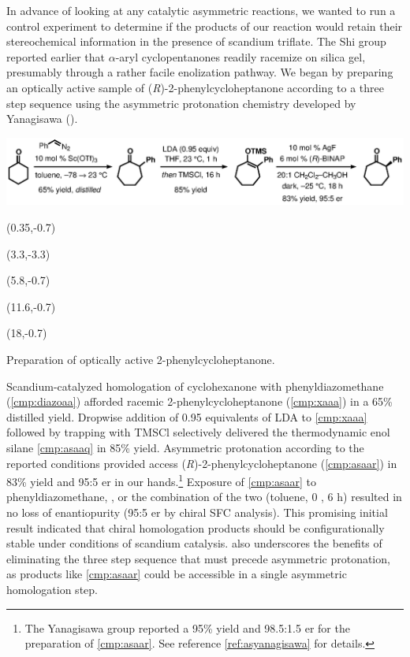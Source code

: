In advance of looking at any catalytic asymmetric reactions, we wanted to run a control experiment
to determine if the products of our reaction would retain their stereochemical information in the
presence of scandium triflate. The Shi group reported earlier that $\alpha$-aryl cyclopentanones
readily racemize on silica gel, presumably through a rather facile enolization
pathway. We began by preparing an optically active sample of
(\textit{R})-2-phenylcycloheptanone according to a three step sequence using the asymmetric
protonation chemistry developed by Yanagisawa
().
  \begin{Scheme}[h]
  \centering
  \includegraphics[scale=0.8]{chp_asymmetric/images/racemizationone}
  \begin{textblock}{1}(0.35,-0.7)  \end{textblock}
  \begin{textblock}{1}(3.3,-3.3)  \end{textblock}
  \begin{textblock}{1}(5.8,-0.7)  \end{textblock}
  \begin{textblock}{1}(11.6,-0.7)  \end{textblock}
  \begin{textblock}{1}(18,-0.7)  \end{textblock}
  \caption{Preparation of optically active 2-phenylcycloheptanone.}
  \label{sch:asracemizationone}
\end{Scheme}   
Scandium-catalyzed homologation of cyclohexanone with phenyldiazomethane (\ref{cmp:diazoaa})
afforded racemic 2-phenylcycloheptanone (\ref{cmp:xaaa}) in a 65\% distilled yield. Dropwise
addition of 0.95 equivalents of LDA to \ref{cmp:xaaa} followed by trapping with TMSCl selectively
delivered the thermodynamic enol silane \ref{cmp:asaaq} in 85\% yield.
Asymmetric protonation according to the reported conditions provided access
(\textit{R})-2-phenylcycloheptanone (\ref{cmp:asaar}) in 83\% yield and 95:5 er in our
hands.\footnote{The Yanagisawa group reported a 95\% yield and 98.5:1.5 er for the preparation of 
\ref{cmp:asaar}.
See reference \ref{ref:asyanagisawa} for details.} Exposure of \ref{cmp:asaar} to phenyldiazomethane,
, or the combination of the two (toluene, 0 \degc, 6 h) resulted in no loss of enantiopurity (95:5 er by chiral SFC analysis). This promising initial result indicated that chiral homologation products should be configurationally
stable under conditions of scandium catalysis.  also
underscores the benefits of eliminating the three step sequence that must precede asymmetric protonation, as products like \ref{cmp:asaar} could
be accessible in a single asymmetric homologation step.


